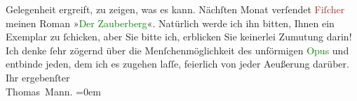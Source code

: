                     Gelegenheit ergreift, zu {\pb}zeigen, was
                    es kann.\pend
           \pstart
           Nächſten Monat verſendet \textcolor{brown}{Fiſcher}{}\ledrightnote{\textcolor{brown}{S. Fischer Verlag}} meinen Roman
                        »\textcolor{green}{Der Zauberberg}{}\ledrightnote{\textcolor{green}{Der Zauberberg. Roman}}«. Natürlich werde ich ihn
                    bitten, Ihnen ein Exemplar zu ſchicken, aber Sie bitte ich, erblicken Sie
                    keinerlei Zumutung darin! Ich denke ſehr zögernd über die Menſchenmöglichkeit
                    des unförmigen \textcolor{green}{Opus}{} und
                    entbinde jeden, dem ich es zugehen laſſe, feierlich von jeder Aeußerung
                    darüber.\pend
           \pstart
           Ihr ergebenſter{\\[\baselineskip]}\spacefill\mbox{Thomas Mann.}\pend
           \leftskip=0em{}\endnumbering{}  
      